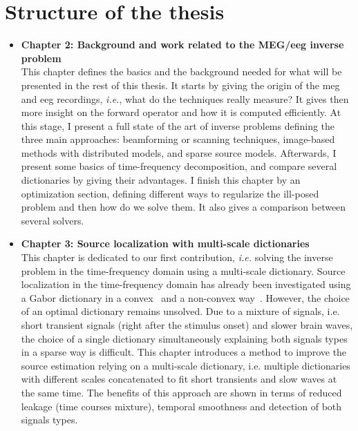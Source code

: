 \section{Structure of the thesis}
\begin{itemize}
\item \textbf{Chapter 2: Background and work related to the
MEG/\ac{eeg} inverse problem}\\
This chapter defines the basics and the background needed for what will be presented in the rest of this thesis. It starts by giving the origin of the \ac{meg} and \ac{eeg} recordings, \textit{i.e.}, what do the techniques really measure? It gives then more insight on the forward operator and how it is computed efficiently. At this stage, I present a full state of the art of inverse problems defining the three main approaches: beamforming or scanning techniques, image-based methods with distributed models, and sparse source models. Afterwards, I present some basics of time-frequency decomposition, and compare several dictionaries by giving their advantages. I finish this chapter by an optimization section, defining different ways to regularize the ill-posed problem and then how do we solve them. It also gives a comparison between several solvers.\\

\item \textbf{Chapter 3: Source localization with multi-scale dictionaries}\\
This chapter is dedicated to our first contribution, \textit{i.e.} solving the inverse problem in the time-frequency domain using a multi-scale dictionary. 
Source localization in the time-frequency domain has already been investigated using a Gabor dictionary in a convex~\cite{Gramfort_Strohmeier_Haueisen_Hamalainen_Kowalski13} and a non-convex way~\cite{irTF-MxNE}. However, the choice of an optimal dictionary remains unsolved. Due to a mixture of signals, i.e. short transient signals (right after the stimulus onset) and slower brain waves, the choice of a single dictionary simultaneously explaining both signals types in a sparse way is difficult. This chapter introduces a method to improve the source estimation relying on a multi-scale dictionary, i.e. multiple dictionaries with different scales concatenated to fit short transients and slow waves at the same time. The benefits of this approach are shown in terms of reduced leakage (time courses mixture), temporal smoothness and detection of both signals types.



\end{itemize}
